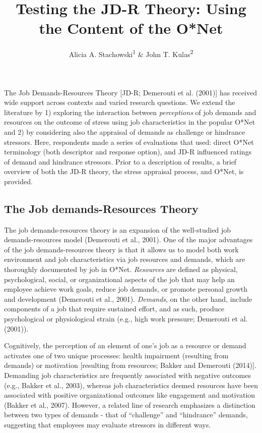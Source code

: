 \documentclass[
  english,
  man]{apa6}
\title{Testing the JD-R Theory: Using the Content of the O*Net}
\author{Alicia A. Stachowski\textsuperscript{1} \& John T. Kulas\textsuperscript{2}}
\date{}
\affiliation{\vspace{0.5cm}\textsuperscript{1} University of Wisconsin - Stout\\\textsuperscript{2} eRg}
\begin{document}
\maketitle

The Job Demands-Resources Theory {[}JD-R; Demerouti et al. (2001){]} has received wide support across contexts and varied research questions. We extend the literature by 1) exploring the interaction between \emph{perceptions} of job demands and resources on the outcome of stress using job characteristics in the popular O*Net and 2) by considering also the appraisal of demands as challenge or hindrance stressors. Here, respondents made a series of evaluations that used: direct O*Net terminology (both descriptor and response option), and JD-R influenced ratings of demand and hindrance stressors. Prior to a description of results, a brief overview of both the JD-R theory, the stress appraisal process, and O*Net, is provided.

\hypertarget{the-job-demands-resources-theory}{%
\subsection{The Job demands-Resources Theory}\label{the-job-demands-resources-theory}}

The job demands-resources theory is an expansion of the well-studied job demands-resources model (Demerouti et al., 2001). One of the major advantages of the job demands-resources theory is that it allows us to model both work environment and job characteristics via job resources and demands, which are thoroughly documented by job in O*Net. \emph{Resources} are defined as physical, psychological, social, or organizational aspects of the job that may help an employee achieve work goals, reduce job demands, or promote personal growth and development (Demerouti et al., 2001). \emph{Demands}, on the other hand, include components of a job that require sustained effort, and as such, produce psychological or physiological strain (e.g., high work pressure; Demerouti et al. (2001)).

Cognitively, the perception of an element of one's job as a resource or demand activates one of two unique processes: health impairment (resulting from demands) or motivation {[}resulting from resources; Bakker and Demerouti (2014){]}. Demanding job characteristics are frequently associated with negative outcomes (e.g., Bakker et al., 2003), whereas job characteristics deemed resources have been associated with positive organizational outcomes like engagement and motivation (Bakker et al., 2007). However, a related line of research emphasizes a distinction between two types of demands - that of ``challenge'' and ``hindrance'' demands, suggesting that employees may evaluate stressors in different ways.
\end{document}
